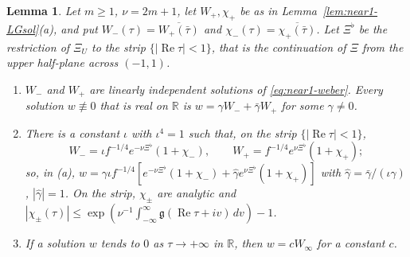 \documentclass[11pt]{amsart}
\newtheorem{lemma}[theorem]{Lemma}
\theoremstyle{definition}
\theoremstyle{remark}
\numberwithin{equation}{section}
\newcommand{\R}{\mathbb{R}}
\DeclareMathOperator{\re}{Re}
\begin{document}
\begin{lemma}\label{lem:near1-twoterm}
Let $m\ge1$, $\nu=2m+1$, let $W_+,\chi_+$ be as in Lemma~\ref{lem:near1-LGsol}(a), and put $W_-(\tau)=\overline{W_+(\bar\tau)}$ and $\chi_-(\tau)=\overline{\chi_+(\bar\tau)}$. Let $\Xi^\flat$ be the restriction of $\Xi_U$ to the strip $\{|\re\tau|<1\}$, that is the continuation of $\Xi$ from the upper half-plane across $(-1,1)$.
\begin{enumerate}
\item[(a)] $W_-$ and $W_+$ are linearly independent solutions of \eqref{eq:near1-weber}. Every solution $w\not\equiv0$ that is real on $\R$ is $w=\gamma W_-+\bar\gamma W_+$ for some $\gamma\ne0$.
\item[(b)] There is a constant $\iota$ with $\iota^4=1$ such that, on the strip $\{|\re\tau|<1\}$,
\[
W_-=\iota f^{-1/4}e^{-\nu\Xi^\flat}(1+\chi_-),\qquad W_+=f^{-1/4}e^{\nu\Xi^\flat}(1+\chi_+);
\]
so, in (a), $w=\gamma\iota f^{-1/4}[e^{-\nu\Xi^\flat}(1+\chi_-)+\hat\gamma e^{\nu\Xi^\flat}(1+\chi_+)]$ with $\hat\gamma=\bar\gamma/(\iota\gamma)$, $|\hat\gamma|=1$. On the strip, $\chi_\pm$ are analytic and $|\chi_\pm(\tau)|\le\exp(\nu^{-1}\int_{-\infty}^\infty\mathfrak g(\re\tau+iv)\,dv)-1$.
\item[(c)] If a solution $w$ tends to $0$ as $\tau\to+\infty$ in $\R$, then $w=cW_\infty$ for a constant $c$.
\end{enumerate}
\end{lemma}
\end{document}
